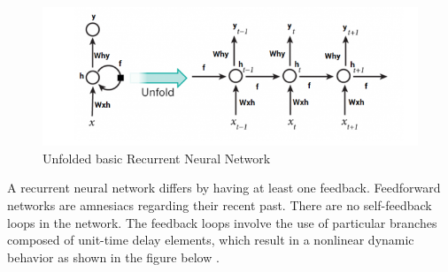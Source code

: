 \begin{figure}[ht!]
\centering
\includegraphics[width=0.8\linewidth]{project/rnn.png}
\caption{Unfolded basic Recurrent Neural Network}

\end{figure}
A recurrent neural network differs by having at least one feedback. Feedforward networks are amnesiacs regarding their recent past. There are no self-feedback loops in the network. The feedback loops involve the use of particular branches composed of unit-time delay elements, which result in a nonlinear dynamic behavior as shown in the figure below \cite{gupta2018fundamentals}.
